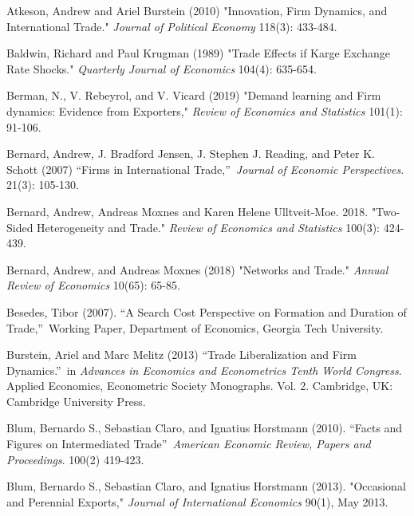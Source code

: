\documentclass[12pt]{article}
\begin{document}
\begin{description}
\item Atkeson, Andrew and Ariel Burstein (2010) "Innovation, Firm Dynamics,
and International Trade." \textit{Journal of Political Economy} 118(3):
433-484.

\item Baldwin, Richard and Paul Krugman (1989) "Trade Effects if Karge
Exchange Rate Shocks." \textit{Quarterly Journal of Economics} 104(4):
635-654.

\item Berman, N., V. Rebeyrol, and V. Vicard (2019) "Demand learning and
Firm dynamics: Evidence from Exporters," \textit{Review of Economics and
Statistics }101(1): 91-106.

\item Bernard, Andrew, J. Bradford Jensen, J. Stephen J. Reading, and Peter
K. Schott (2007) \textquotedblleft Firms in International
Trade,\textquotedblright\ \textit{Journal of Economic Perspectives}. 21(3):
105-130.

\item Bernard, Andrew, Andreas Moxnes and Karen Helene Ulltveit-Moe. 2018.
"Two-Sided Heterogeneity and Trade." \textit{Review of Economics and
Statistics }100(3): 424-439.

\item Bernard, Andrew, and Andreas Moxnes (2018) "Networks and Trade." 
\textit{Annual Review of Economics} 10(65): 65-85.

\item Besedes, Tibor (2007). \textquotedblleft A Search Cost Perspective on
Formation and Duration of Trade,\textquotedblright\ Working Paper,
Department of Economics, Georgia Tech University.

\item Burstein, Ariel and Marc Melitz (2013) \textquotedblleft Trade
Liberalization and Firm Dynamics.\textquotedblright\ in \textit{Advances in
Economics and Econometrics Tenth World Congress}. Applied Economics,
Econometric Society Monographs. Vol. 2. Cambridge, UK: Cambridge University
Press.

\item Blum, Bernardo S., Sebastian Claro, and Ignatius Horstmann (2010).
\textquotedblleft Facts and Figures on Intermediated
Trade\textquotedblright\ \textit{American Economic Review, Papers and
Proceedings}. 100(2) 419-423.

\item Blum, Bernardo S., Sebastian Claro, and Ignatius Horstmann (2013).
"Occasional and Perennial Exports," \textit{Journal of International
Economics} 90(1), May 2013.


\end{description}
\end{document}
